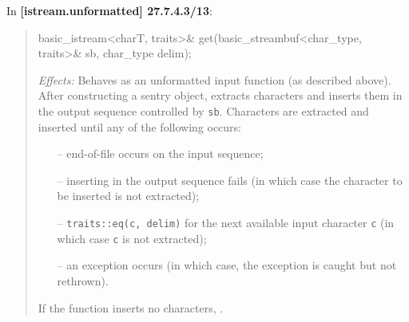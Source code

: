 \documentclass{wg21}
\begin{document}
In \textbf{[istream.unformatted] 27.7.4.3/13}:
\begin{quote}
\begin{codeblock}
basic_istream<charT, traits>& get(basic_streambuf<char_type, traits>& sb, char_type delim);
\end{codeblock}
\textit{Effects:} Behaves as an unformatted input function (as described above).
After constructing a sentry object, extracts characters and inserts them in the
output sequence controlled by \texttt{sb}. Characters are extracted and inserted
until any of the following occurs:
\begin{itemize}
  \item[--] end-of-file occurs on the input sequence;
  \item[--] inserting in the output sequence fails (in which case the character
            to be inserted is not extracted);
  \item[--] \texttt{traits::eq(c, delim)} for the next available input character
            \texttt{c} (in which case \texttt{c} is not extracted);
  \item[--] an exception occurs (in which case, the exception is caught
            but not rethrown).
\end{itemize}
If the function inserts no characters, .
\end{quote}
\end{document}
